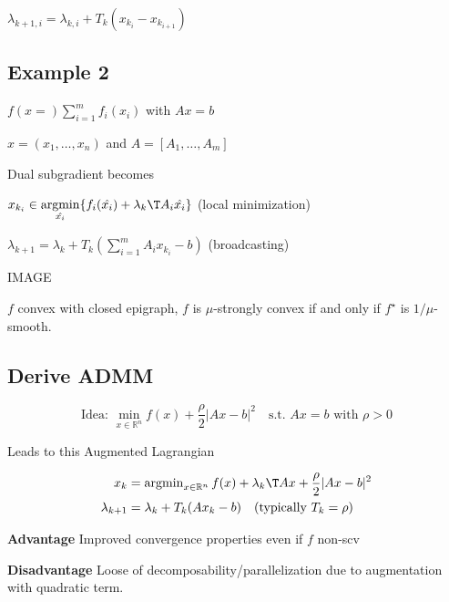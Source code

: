 $\lambda_{k+1,i}=\lambda_{k,i}+T_k(x_{k_i}-x_{k_{i+1}})$

\subsection{Example 2}

$f(x=) \sum_{i = 1}^{m} f_i(x_i)$ with $Ax=b$

$x = (x_1,\dots,x_n)$ and $A=[A_1,\dots,A_m]$

Dual subgradient becomes

$x_{k_i}\in \underset{\hat{x_i}} {\operatorname{argmin}} \{f_i(\hat{x_i})+\lambda_{k}\T A_i\hat{x_i}\}$
(local minimization)


$\lambda_{k+1}=\lambda_{k}+T_k(\sum_{i = 1}^{m}A_ix_{k_i}-b)$
(broadcasting)

IMAGE  %

\begin{proposition}
	$f$ convex with closed epigraph, $f$ is $\mu$-strongly convex
	if and only if $f^\star$ is $1/\mu$-smooth.
\end{proposition}

%
%
%
%

\subsection{Derive ADMM}

$$
	\text{Idea: }
	\min_{x \in \mathbb{R}^{n}}f(x)+ \frac{\rho}{2}|Ax-b|^2
	\quad\text{s.t. }Ax=b\text{ with }\rho > 0
$$

Leads to this Augmented Lagrangian

$$\begin{aligned}
		x_k           & =\operatorname{argmin}_{x\in\mathbb{R}^{n}}
		f(x)+\lambda_k\T Ax+\frac{\rho}{2}|Ax-b|^2
		\\
		\lambda_{k+1} & = \lambda_k+T_k(Ax_k-b)
		\quad\text{(typically }T_k=\rho)
	\end{aligned}$$

\textbf{Advantage}
Improved convergence properties even if
$f$ non-scv

\textbf{Disadvantage}
Loose of decomposability/parallelization
due to augmentation with quadratic term.

